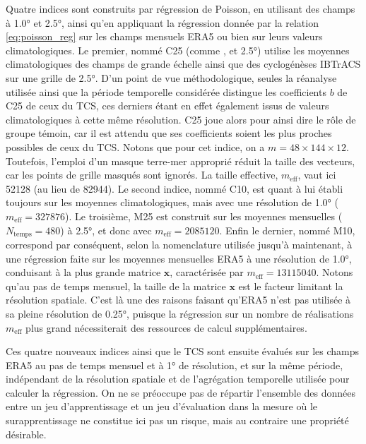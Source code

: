 \documentclass[../main.tex]{subfiles}
\begin{document}
Quatre indices sont construits par régression de Poisson, en utilisant des champs à \ang{1.0} et \ang{2.5}, ainsi qu'en appliquant la régression donnée par la
relation \ref{eq:poisson_reg} sur les champs mensuels ERA5 ou bien sur leurs valeurs climatologiques. Le premier, nommé C25 (comme , et
\ang{2.5}) utilise les moyennes climatologiques des champs de grande échelle ainsi que des cyclogénèses IBTrACS sur une grille de \ang{2.5}. D'un point de vue
méthodologique, seules la réanalyse utilisée ainsi que la période temporelle considérée distingue les coefficients $b$ de C25 de ceux du TCS, ces derniers étant
en effet également issus de valeurs climatologiques à cette même résolution. C25 joue alors pour ainsi dire le rôle de groupe témoin, car il est attendu que ses
coefficients soient les plus proches possibles de ceux du TCS. Notons que pour cet indice, on a $m = \num{48} \times \num{144} \times \num{12}$. Toutefois,
l'emploi d'un masque terre-mer approprié réduit la taille des vecteurs, car les points de grille masqués sont ignorés. La taille effective, $m_{\mathrm{eff}}$,
vaut ici \num{52128} (au lieu de \num{82944}). Le second indice, nommé C10, est quant à lui établi toujours sur les moyennes climatologiques, mais avec une
résolution de \ang{1.0} ($m_{\mathrm{eff}} = \num{327876}$). Le troisième, M25 est construit sur les moyennes mensuelles ($N_{\mathrm{temps}} = \num{480}$) à
\ang{2.5}, et donc avec $m_{\mathrm{eff}} = \num{2085120}$. Enfin le dernier, nommé M10, correspond par conséquent, selon la nomenclature utilisée jusqu'à
maintenant, à une régression faite sur les moyennes mensuelles ERA5 à une résolution de \ang{1.0}, conduisant à la plus grande matrice $\mathbf{x}$,
caractérisée par $m_{\mathrm{eff}} = \num{13115040}$. Notons qu'au pas de temps mensuel, la taille de la matrice $\mathbf{x}$ est le facteur limitant la
résolution spatiale. C'est là une des raisons faisant qu'ERA5 n'est pas utilisée à sa pleine résolution de \ang{0.25}, puisque la régression sur un nombre de
réalisations $m_{\mathrm{eff}}$ plus grand nécessiterait des ressources de calcul supplémentaires.

Ces quatre nouveaux indices ainsi que le TCS sont ensuite évalués sur les champs ERA5 au pas de temps mensuel et à \ang{1} de résolution, et sur la même période,
indépendant de la résolution spatiale et de l'agrégation temporelle utilisée pour calculer la régression. On ne se préoccupe pas de répartir l'ensemble des
données entre un jeu d'apprentissage et un jeu d'évaluation dans la mesure où le surapprentissage ne constitue ici pas un risque, mais au contraire une
propriété désirable.
\end{document}
